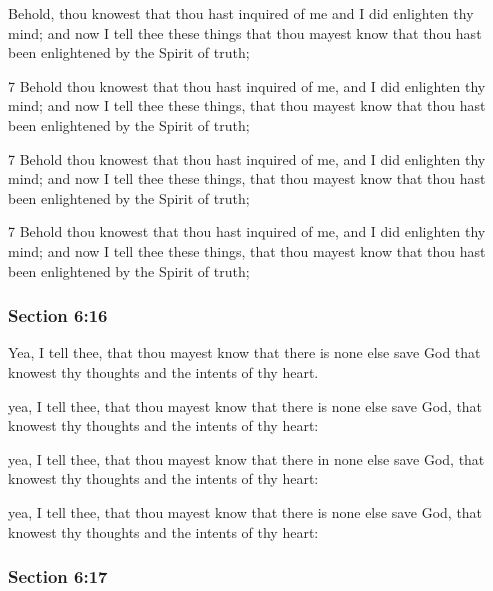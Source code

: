 		Behold, thou knowest that thou hast inquired of me and I did enlighten thy mind; and now I tell thee these things that thou mayest know that thou hast been enlightened by the Spirit of truth;

		\begin{framed}
		\scriptsize
			\begin{compactdesc}
				\item[JSP] 7 Behold thou knowest that thou hast inquired of me, and I did enlighten thy mind; and now I tell thee these things, that thou mayest know that thou hast been enlightened by the Spirit of truth;
				\item[DC 1835] 7 Behold thou knowest that thou hast inquired of me, and I did enlighten thy mind; and now I tell thee these things, that thou mayest know that thou hast been enlightened by the Spirit of truth;
				\item[DC 1844] 7 Behold thou knowest that thou hast inquired of me, and I did enlighten thy mind; and now I tell thee these things, that thou mayest know that thou hast been enlightened by the Spirit of truth;
			\end{compactdesc}
		\end{framed}

	\subsubsection{Section 6:16} %
		\label{DC6-16}

		Yea, I tell thee, that thou mayest know that there is none else save God that knowest thy thoughts and the intents of thy heart.

		\begin{framed}
		\scriptsize
			\begin{compactdesc}
				\item[JSP] yea, I tell thee, that thou mayest know that there is none else save God, that knowest thy thoughts and the intents of thy heart:
				\item[DC 1835] yea, I tell thee, that thou mayest know that there in none else save God, that knowest thy thoughts and the intents of thy heart:
				\item[DC 1844] yea, I tell thee, that thou mayest know that there is none else save God, that knowest thy thoughts and the intents of thy heart:
			\end{compactdesc}
		\end{framed}

	\subsubsection{Section 6:17} %
		\label{DC6-17}

